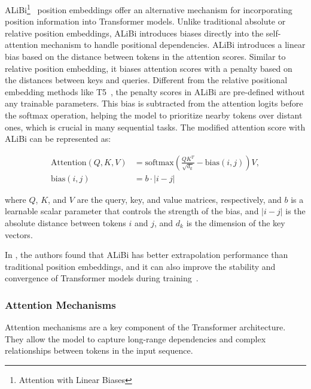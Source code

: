 ALiBi\footnote{Attention with Linear Biases}~\cite{press2022train} position embeddings offer an alternative mechanism for incorporating position information into Transformer models.
Unlike traditional absolute or relative position embeddings, ALiBi introduces biases directly into the self-attention mechanism to handle positional dependencies.
ALiBi introduces a linear bias based on the distance between tokens in the attention scores.
Similar to relative position embedding, it biases attention scores with a penalty based on the distances between keys and queries.
Different from the relative positional embedding methods like T5~\cite{zeng2021pangu}, the penalty scores in ALiBi are pre-defined without any trainable parameters.
This bias is subtracted from the attention logits before the softmax operation, helping the model to prioritize nearby tokens over distant ones, which is crucial in many sequential tasks.
The modified attention score with ALiBi can be represented as:

\begin{equation}
	\begin{aligned}
		\text{Attention}(Q, K, V) & = \text{softmax}\left(\frac{QK^T}{\sqrt{d_k}} - \text{bias}(i,j)\right)V, \\
		\text{bias}(i,j)          & = b \cdotp |i-j|
	\end{aligned}
	\label{eq:alibi}
\end{equation}

\noindent where \(Q\), \(K\), and \(V\) are the query, key, and value matrices, respectively, and \(b\) is a learnable scalar parameter that controls the strength of the bias, and \(|i-j|\) is the absolute distance between tokens \(i\) and \(j\), and \(d_k\) is the dimension of the key vectors.

In \textcite{press2022train}, the authors found that ALiBi has better extrapolation performance than traditional position embeddings, and it can also improve the stability and convergence of Transformer models during training~\cite{workshop2023bloom}.

\subsubsection{Attention Mechanisms}
\label{subsubsec:attention-mechanisms}

Attention mechanisms are a key component of the Transformer architecture.
They allow the model to capture long-range dependencies and complex relationships between tokens in the input sequence.


